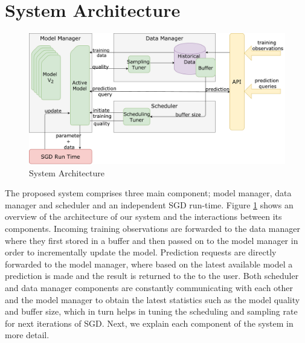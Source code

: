 \documentclass{vldb}
\begin{document}
\section{System Architecture} \label{sec:system-architecutre}
\begin{figure}[t]
\centering
\includegraphics[width=\columnwidth]{../images/system-architecture-6.pdf}
\caption{System Architecture}
\label{fig:system-architecture}
\end{figure}
The proposed system comprises three main component; model manager, data manager and scheduler and an independent SGD run-time. 
Figure \ref{fig:system-architecture} shows an overview of the architecture of our system and the interactions between its components.
Incoming training observations are forwarded to the data manager where they first stored in a buffer and then passed on to the model manager in order to incrementally update the model.
Prediction requests are directly forwarded to the model manager, where based on the latest available model a prediction is made and the result is returned to the to the user.
Both scheduler and data manager components are constantly communicating with each other and the model manager to obtain the latest statistics such as the model quality and buffer size, which in turn helps in tuning the scheduling and sampling rate for next iterations of SGD. 
Next, we explain each component of the system in more detail.
\end{document}
